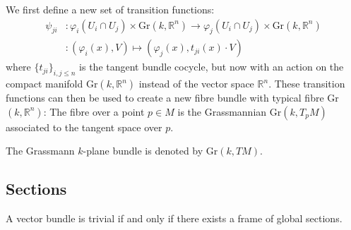 	\begin{construct}\label{manifolds:grassmann_bundle}
		We first define a new set of transition functions:
		\begin{align}
			\psi_{ji}&:\varphi_i(U_i\cap U_j)\times \text{Gr}(k, \mathbb{R}^n) \rightarrow \varphi_j(U_i\cap U_j)\times \text{Gr}(k, \mathbb{R}^n)\nonumber\\
			&:(\varphi_i(x), V)\mapsto(\varphi_j(x), t_{ji}(x)\cdot V)
		\end{align}
		where $\{t_{ji}\}_{i, j\leq n}$ is the tangent bundle cocycle, but now with an action on the compact manifold Gr$(k, \mathbb{R}^n)$ instead of the vector space $\mathbb{R}^n$. These transition functions can then be used to create a new fibre bundle with typical fibre Gr$(k, \mathbb{R}^n)$: The fibre over a point $p\in M$ is the Grassmannian Gr$(k, T_pM)$ associated to the tangent space over $p$.
	\end{construct}
	\begin{notation}
		The Grassmann $k$-plane bundle is denoted by Gr$(k, TM)$.
	\end{notation}
	
	
\subsection{Sections}
	
	\begin{property}\label{diff:prop:trivial_vector_bundle}
		A vector bundle is trivial if and only if there exists a frame of global sections.
	\end{property}
	
